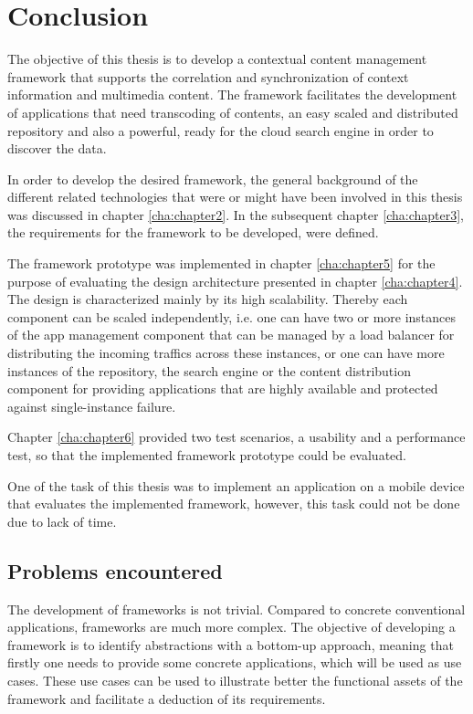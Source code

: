 \chapter{Conclusion\label{cha:chapter7}}
The objective of this thesis is to develop a contextual content management framework that supports the correlation and synchronization of context information and multimedia content. The framework facilitates the development of applications that need transcoding of contents, an easy scaled and distributed repository and also a powerful, ready for the cloud search engine in order to discover the data. 

In order to develop the desired framework, the general background of the different related technologies that were or might have been involved in this thesis was discussed in chapter \ref{cha:chapter2}. In the subsequent chapter \ref{cha:chapter3}, the requirements for the framework to be developed, were defined.

The framework prototype was implemented in chapter \ref{cha:chapter5} for the purpose of evaluating the design architecture presented in chapter \ref{cha:chapter4}. The design is characterized mainly by its high scalability. Thereby each component can be scaled independently, i.e. one can have two or more instances of the app management component that can be managed by a load balancer for distributing the incoming traffics across these instances, or one can have more instances of the repository, the search engine or the content distribution component for providing applications that are highly available and protected against single-instance failure.

Chapter \ref{cha:chapter6} provided two test scenarios, a usability and a performance test, so that the implemented framework prototype could be evaluated.

One of the task of this thesis was to implement an application on a mobile device that evaluates the implemented framework, however, this task could not be done due to lack of time.
 
\section{Problems encountered}
The development of frameworks is not trivial. Compared to concrete conventional applications, frameworks are much more complex. The objective of developing a framework is to identify abstractions with a bottom-up approach, meaning that firstly one needs to provide some concrete applications, which will be used as use cases. These use cases can be used to illustrate better the functional assets of the framework and facilitate a deduction of its requirements.

